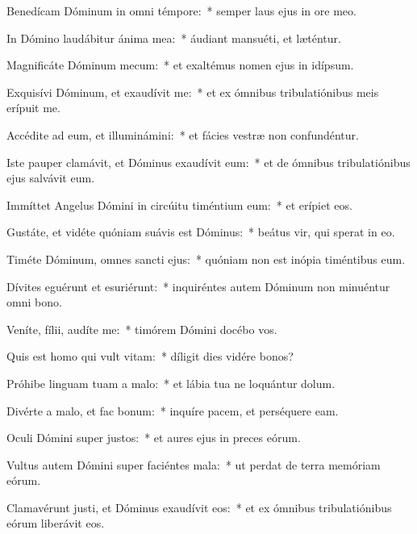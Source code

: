 \item Benedícam Dóminum in omni témpore:~* semper laus ejus in ore meo.

\item In Dómino laudábitur ánima mea:~* áudiant mansuéti, et læténtur.

\item Magnificáte Dóminum mecum:~* et exaltémus nomen ejus in idípsum.

\item Exquisívi Dóminum, et exaudívit me:~* et ex ómnibus tribulatiónibus meis erípuit me.

\item Accédite ad eum, et illuminámini:~* et fácies vestræ non confundéntur.

\item Iste pauper clamávit, et Dóminus exaudívit eum:~* et de ómnibus tribulatiónibus ejus salvávit eum.

\item Immíttet Angelus Dómini in circúitu timéntium eum:~* et erípiet eos.

\item Gustáte, et vidéte quóniam suávis est Dóminus:~* beátus vir, qui sperat in eo.

\item Timéte Dóminum, omnes sancti ejus:~* quóniam non est inópia timéntibus eum.

\item Dívites eguérunt et esuriérunt:~* inquiréntes autem Dóminum non minuéntur omni bono.

\item Veníte, fílii, audíte me:~* timórem Dómini docébo vos.

\item Quis est homo qui vult vitam:~* díligit dies vidére bonos?

\item Próhibe linguam tuam a malo:~* et lábia tua ne loquántur dolum.

\item Divérte a malo, et fac bonum:~* inquíre pacem, et perséquere eam.

\item Oculi Dómini super justos:~* et aures ejus in preces eórum.

\item Vultus autem Dómini super faciéntes mala:~* ut perdat de terra memóriam eórum.

\item Clamavérunt justi, et Dóminus exaudívit eos:~* et ex ómnibus tribulatiónibus eórum liberávit eos.

